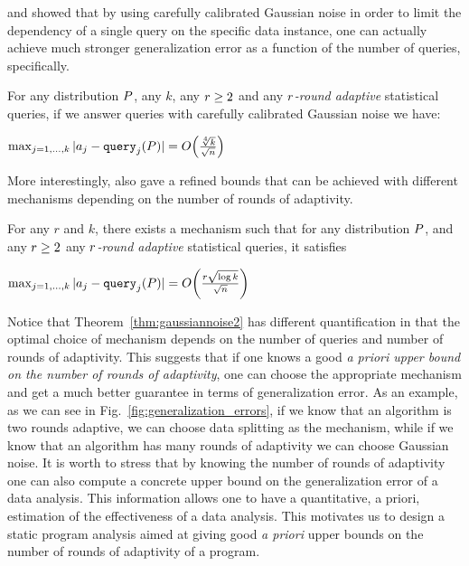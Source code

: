 \cite{DworkFHPRR15} and \cite{BassilyNSSSU16} showed that by using carefully calibrated Gaussian noise in order to limit the dependency of a single query on the specific data instance, one 
can actually achieve much stronger generalization error as a function of the number of queries, specifically.
\begin{thm} \label{thm:gaussiannoise} For any distribution $P$, any $k$, any $r \geq 2$ and any \emph{$r$-round adaptive} statistical queries, if we answer queries with carefully calibrated Gaussian noise we have:
\begin{center}
  $
\max_{j=1,\dots,k} | \answer_j - \query_j(\dist) | = O\left( \frac{\sqrt[4]{k}}{\sqrt{n}}  \right)
$  
\end{center}
\end{thm}
More interestingly, \cite{DworkFHPRR15}
also gave a refined bounds that can be achieved with different mechanisms depending on the number of rounds of adaptivity.   \begin{thm} \label{thm:gaussiannoise2} For any $r$ and $k$, there exists a mechanism such that for any distribution $P$, and any $r \geq 2$ any \emph{$r$-round adaptive} statistical queries, it satisfies
\begin{center}
  $
\max_{j=1,\dots,k} | \answer_j - \query_j(\dist) | = O\left( \frac{r \sqrt{\log k}}{\sqrt{n}}  \right)
$  
\end{center}
\end{thm}
Notice that Theorem~\ref{thm:gaussiannoise2} has different quantification in that the optimal choice of mechanism depends on the number of queries {and number of rounds of adaptivity}.  This suggests that if one knows a good \emph{a priori upper bound on the number of rounds of adaptivity}, one can choose the appropriate mechanism and get a much better guarantee in terms of generalization error.
As an example, as we can see in Fig.~\ref{fig:generalization_errors}, if we know that an algorithm is two rounds adaptive, we can choose data splitting as {the} mechanism, while if we know that an algorithm has many rounds of adaptivity we can choose Gaussian noise. It is worth to stress that by knowing the number of rounds of adaptivity one can also compute a concrete upper bound on the generalization error of a data analysis. This information allows one to have a quantitative, a priori, estimation of the effectiveness of a data analysis. 
This motivates us to design a static program analysis aimed at giving good \emph{a priori} upper bounds on the number of rounds of adaptivity of a program. 


